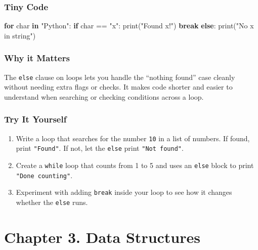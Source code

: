 \documentclass[
  letterpaper,
  DIV=11,
  numbers=noendperiod]{scrreprt}
\newenvironment{Shaded}{\begin{snugshade}}{\end{snugshade}}
\newcommand{\BuiltInTok}[1]{\textcolor[rgb]{0.00,0.23,0.31}{#1}}
\newcommand{\ControlFlowTok}[1]{\textcolor[rgb]{0.00,0.23,0.31}{\textbf{#1}}}
\newcommand{\KeywordTok}[1]{\textcolor[rgb]{0.00,0.23,0.31}{\textbf{#1}}}
\newcommand{\NormalTok}[1]{\textcolor[rgb]{0.00,0.23,0.31}{#1}}
\newcommand{\OperatorTok}[1]{\textcolor[rgb]{0.37,0.37,0.37}{#1}}
\newcommand{\StringTok}[1]{\textcolor[rgb]{0.13,0.47,0.30}{#1}}
\providecommand{\tightlist}{%
  \setlength{\itemsep}{0pt}\setlength{\parskip}{0pt}}
\begin{document}
\subsubsection{Tiny Code}\label{tiny-code-20}

\begin{Shaded}
\begin{Highlighting}[]
\ControlFlowTok{for}\NormalTok{ char }\KeywordTok{in} \StringTok{"Python"}\NormalTok{:}
    \ControlFlowTok{if}\NormalTok{ char }\OperatorTok{==} \StringTok{"x"}\NormalTok{:}
        \BuiltInTok{print}\NormalTok{(}\StringTok{"Found x!"}\NormalTok{)}
        \ControlFlowTok{break}
\ControlFlowTok{else}\NormalTok{:}
    \BuiltInTok{print}\NormalTok{(}\StringTok{"No x in string"}\NormalTok{)}
\end{Highlighting}
\end{Shaded}

\subsubsection{Why it Matters}\label{why-it-matters-20}

The \texttt{else} clause on loops lets you handle the ``nothing found''
case cleanly without needing extra flags or checks. It makes code
shorter and easier to understand when searching or checking conditions
across a loop.

\subsubsection{Try It Yourself}\label{try-it-yourself-20}

\begin{enumerate}
\def\labelenumi{\arabic{enumi}.}
\tightlist
\item
  Write a loop that searches for the number \texttt{10} in a list of
  numbers. If found, print \texttt{"Found"}. If not, let the
  \texttt{else} print \texttt{"Not\ found"}.
\item
  Create a \texttt{while} loop that counts from 1 to 5 and uses an
  \texttt{else} block to print \texttt{"Done\ counting"}.
\item
  Experiment with adding \texttt{break} inside your loop to see how it
  changes whether the \texttt{else} runs.
\end{enumerate}

\section{Chapter 3. Data Structures}\label{chapter-3.-data-structures}
\end{document}
